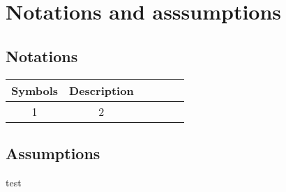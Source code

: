 \section{Notations and asssumptions}
\subsection{Notations}

\begin{table}[!h]
\centering
\begin{tabular}{cccccc}
    
    \toprule
    Symbols & Description \\ 
    \midrule
    1 & 2 \\
    \bottomrule
\end{tabular}
\end{table}

\subsection{Assumptions}

test